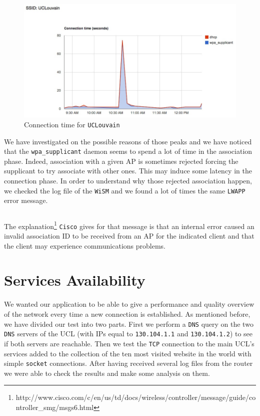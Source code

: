 \begin{figure}[H]
	\centering
   \includegraphics[width=1\textwidth]{Pictures/chapter6/time-uclouvain.jpg}
   \caption{Connection time for \texttt{UCLouvain}}
\end{figure} 

We have investigated on the possible reasons of those peaks and we have noticed that the \texttt{wpa\_supplicant} daemon seems to spend a lot of time in the association phase. Indeed, association with a given AP is sometimes rejected forcing the supplicant to try associate with other ones. This may induce some latency in the connection phase. In order to understand why those rejected association happen, we checked the log file of the \texttt{WiSM} and we found a lot of times the same \texttt{LWAPP} error message.\\

\begin{lstlisting}[frame=single,breaklines=true,caption={\texttt{WiSM} association error message}]
%LWAPP-3-INVALID_AID2: Association identifier [int] for client [hex]:[hex]:[hex]:[hex]:[hex]:[hex] is already in use by[hex]:[hex]:[hex]:[hex]:[hex]:[hex]
\end{lstlisting}

The explanation\footnote{http://www.cisco.com/c/en/us/td/docs/wireless/controller/message/guide/controller\_smg/msgs6.html} \texttt{Cisco} gives for that message is that an internal error caused an invalid association ID to be received from an AP for the indicated client and that the client may experience communications problems.



\section{Services Availability}
We wanted our application to be able to give a performance and quality overview of the network every time a new connection is established. As mentioned before, we have divided our test into two parts. First we perform a \texttt{DNS} query on the two \texttt{DNS} servers of the UCL (with IPs equal to \texttt{130.104.1.1} and \texttt{130.104.1.2}) to see if both servers are reachable. Then we test the \texttt{TCP} connection to the main UCL's services added to the collection of the ten most visited website in the world with simple \texttt{socket} connections. After having received several log files from the router we were able to check the results and make some analysis on them. 

